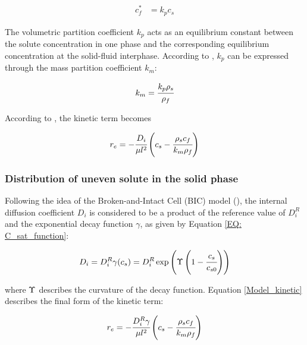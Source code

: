 \documentclass[a4paper,fleqn]{cas-dc}
\begin{document}
		{\footnotesize
			\begin{align} \label{Linear_equilibirum}
				c_f^* &= k_p c_s
		\end{align} }
		
		The volumetric partition coefficient $k_p$ acts as an equilibrium constant between the solute concentration in one phase and the corresponding equilibrium concentration at the solid-fluid interphase. According to \citet{Spiro2007}, $k_p$ can be expressed through the mass partition coefficient $k_m$:
		
		{\footnotesize
			\begin{align}
				k_m = \cfrac{k_p \rho_s}{\rho_f}
		\end{align} }
		
		According to \citet{Reverchon1996}, the kinetic term becomes
		
		{\footnotesize
			\begin{equation}
				\label{Model_kinetic_no_sat}
				r_e = -\cfrac{D_i}{ \mu l^2 } \left(c_s - \cfrac{\rho_s c_f}{k_m \rho_f} \right)
		\end{equation} }
		
		\subsubsection{Distribution of uneven solute in the solid phase} \label{CH: Gamma_Function}
		
		Following the idea of the Broken-and-Intact Cell (BIC) model (\citet{Sovova2017}), the internal diffusion coefficient $D_i$ is considered to be a product of the reference value of $D_i^R$ and the exponential decay function $\gamma$, as given by Equation \ref{EQ: C_sat_function}:
		
		{\footnotesize
			\begin{equation}
				D_i = D_i^R \gamma(c_s) = D_i^R \exp \left( \Upsilon \left( 1-\cfrac{ c_s }{c_{s0}} \right) \right) \label{EQ: C_sat_function}
		\end{equation} }
		
		where  ${\color{black}\Upsilon}$ describes the curvature of the decay function. Equation \ref{Model_kinetic} describes the final form of the kinetic term:
		
		{\footnotesize
			\begin{equation}
				\label{Model_kinetic}
				r_e = -\cfrac{D_i^R \gamma }{ \mu l^2 } \left( c_s  - \cfrac{\rho_s c_f }{ k_m \rho_f }  \right)
		\end{equation} }
		
\end{document}
